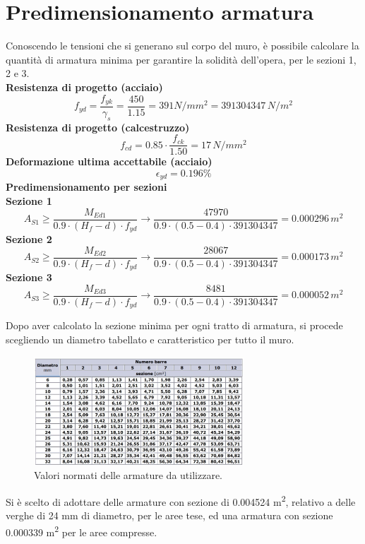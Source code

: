 \section{Predimensionamento armatura}
Conoscendo le tensioni che si generano sul corpo del muro, è possibile calcolare la quantità di armatura minima per garantire la solidità dell'opera, per le sezioni 1, 2 e 3.\\
\textbf{Resistenza di progetto (acciaio)}
\begin{equation*}
    f_{yd} = \frac{f_{yk}}{\gamma_s} = \frac{450}{1.15} = 391 N/mm^2 = 391304347 \,N/m^2
\end{equation*}
\textbf{Resistenza di progetto (calcestruzzo)}
\begin{equation*}
    f_{cd} = 0.85 \cdot \frac{f_{ck}}{1.50} = 17 \,N/mm^2
\end{equation*}
\textbf{Deformazione ultima accettabile (acciaio)}
\begin{equation*}
    \epsilon_{yd} = 0.196\%
\end{equation*}
\textbf{Predimensionamento per sezioni\\}
\textbf{Sezione 1}
\begin{equation*}
    A_{S1} \geq \frac{M_{Ed1}}{0.9 \cdot (H_f -d) \cdot f_{yd}} \rightarrow \frac{47970}{0.9 \cdot (0.5 -0.4 ) \cdot 391304347} = 0.000296 \,m^2
\end{equation*}
\textbf{Sezione 2}
\begin{equation*}
    A_{S2} \geq \frac{M_{Ed2}}{0.9 \cdot (H_f -d) \cdot f_{yd}} \rightarrow \frac{28067}{0.9 \cdot (0.5 -0.4 ) \cdot 391304347} = 0.000173 \,m^2
\end{equation*}
\textbf{Sezione 3}
\begin{equation*}
    A_{S3} \geq \frac{M_{Ed3}}{0.9 \cdot (H_f -d) \cdot f_{yd}} \rightarrow \frac{8481}{0.9 \cdot (0.5 -0.4 ) \cdot 391304347} =  0.000052 \,m^2
\end{equation*}

Dopo aver calcolato la sezione minima per ogni tratto di armatura, si procede scegliendo un diametro tabellato e caratteristico per tutto il muro.

\begin{figure}[H]
    \centering
    \includegraphics[width=0.7\textwidth]{immagini/dimensionamento_armatura.png} \hfill
        \caption{Valori normati delle armature da utilizzare.}
    \label{figure:pesi_muro}
\end{figure}
Si è scelto di adottare delle armature con sezione di 0.004524 \unit{m^2}, relativo a delle verghe di 24 mm di diametro, per le aree tese, ed una armatura con sezione 0.000339 \unit{m^2} per le aree compresse.

